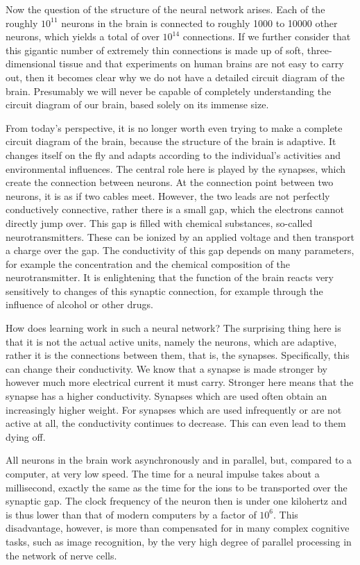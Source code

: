\documentclass[10pt]{article}
\begin{document}
Now the question of the structure of the neural network arises. Each of the roughly $10^{11}$ neurons in the brain is connected to roughly 1000 to 10000 other neurons, which yields a total of over $10^{14}$ connections. If we further consider that this gigantic number of extremely thin connections is made up of soft, three-dimensional tissue and that experiments on human brains are not easy to carry out, then it becomes clear why we do not have a detailed circuit diagram of the\\
brain. Presumably we will never be capable of completely understanding the circuit diagram of our brain, based solely on its immense size.

From today's perspective, it is no longer worth even trying to make a complete circuit diagram of the brain, because the structure of the brain is adaptive. It changes itself on the fly and adapts according to the individual's activities and environmental influences. The central role here is played by the synapses, which create the connection between neurons. At the connection point between two neurons, it is as if two cables meet. However, the two leads are not perfectly conductively connective, rather there is a small gap, which the electrons cannot directly jump over. This gap is filled with chemical substances, so-called neurotransmitters. These can be ionized by an applied voltage and then transport a charge over the gap. The conductivity of this gap depends on many parameters, for example the concentration and the chemical composition of the neurotransmitter. It is enlightening that the function of the brain reacts very sensitively to changes of this synaptic connection, for example through the influence of alcohol or other drugs.

How does learning work in such a neural network? The surprising thing here is that it is not the actual active units, namely the neurons, which are adaptive, rather it is the connections between them, that is, the synapses. Specifically, this can change their conductivity. We know that a synapse is made stronger by however much more electrical current it must carry. Stronger here means that the synapse has a higher conductivity. Synapses which are used often obtain an increasingly higher weight. For synapses which are used infrequently or are not active at all, the conductivity continues to decrease. This can even lead to them dying off.

All neurons in the brain work asynchronously and in parallel, but, compared to a computer, at very low speed. The time for a neural impulse takes about a millisecond, exactly the same as the time for the ions to be transported over the synaptic gap. The clock frequency of the neuron then is under one kilohertz and is thus lower than that of modern computers by a factor of $10^{6}$. This disadvantage, however, is more than compensated for in many complex cognitive tasks, such as image recognition, by the very high degree of parallel processing in the network of nerve cells.
\end{document}

